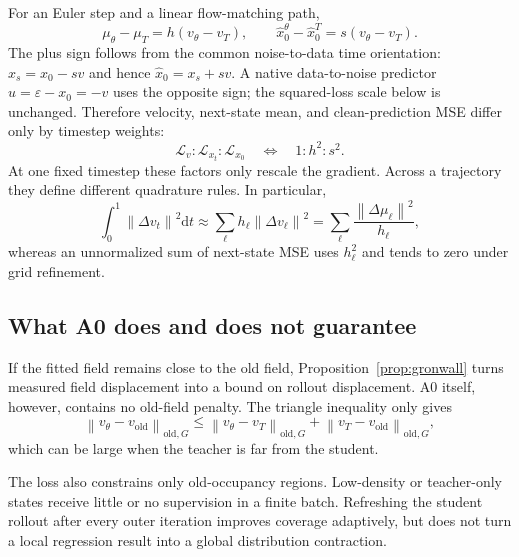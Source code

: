 \documentclass[11pt,a4paper]{article}
\newcommand{\norm}[1]{\left\lVert #1 \right\rVert}
\newcommand{\dd}{\mathrm{d}}
\newcommand{\vold}{v_{\mathrm{old}}}
\newcommand{\vT}{v_T}
\newcommand{\vtheta}{v_\theta}
\theoremstyle{plain}
\theoremstyle{definition}
\begin{document}
For an Euler step and a linear flow-matching path,
\begin{equation}
\mu_\theta-\mu_T
  =h(\vtheta-\vT),
\qquad
\widehat x_0^\theta-\widehat x_0^T
  =s(\vtheta-\vT).
\label{eq:a0-spaces}
\end{equation}
The plus sign follows from the common noise-to-data time orientation:
$x_s=x_0-sv$ and hence $\widehat x_0=x_s+sv$.  A native data-to-noise predictor
$u=\varepsilon-x_0=-v$ uses the opposite sign; the squared-loss scale below is unchanged.
Therefore velocity, next-state mean, and clean-prediction MSE differ only by timestep weights:
\begin{equation}
\mathcal L_v:\mathcal L_{x_t}:\mathcal L_{x_0}
\quad\Longleftrightarrow\quad
1:h^2:s^2 .
\label{eq:a0-space-weights}
\end{equation}
At one fixed timestep these factors only rescale the gradient.  Across a trajectory they define
different quadrature rules.  In particular,
\begin{equation}
\int_0^1\norm{\Delta v_t}^2\dd t
\approx
\sum_\ell h_\ell\norm{\Delta v_\ell}^2
=
\sum_\ell \frac{\norm{\Delta\mu_\ell}^2}{h_\ell},
\label{eq:a0-control-quadrature}
\end{equation}
whereas an unnormalized sum of next-state MSE uses $h_\ell^2$ and tends to zero under grid
refinement.

\subsection{What A0 does and does not guarantee}

If the fitted field remains close to the old field, Proposition~\ref{prop:gronwall} turns measured
field displacement into a bound on rollout displacement.  A0 itself, however, contains no
old-field penalty.  The triangle inequality only gives
\begin{equation}
\norm{\vtheta-\vold}_{\mathrm{old},G}
\le
\norm{\vtheta-\vT}_{\mathrm{old},G}
+
\norm{\vT-\vold}_{\mathrm{old},G},
\label{eq:a0-no-trust}
\end{equation}
which can be large when the teacher is far from the student.

The loss also constrains only old-occupancy regions.  Low-density or teacher-only states receive
little or no supervision in a finite batch.  Refreshing the student rollout after every outer
iteration improves coverage adaptively, but does not turn a local regression result into a global
distribution contraction.
\end{document}

